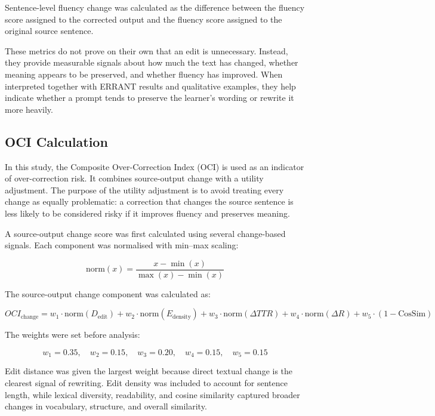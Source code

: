 Sentence-level fluency change was calculated as the difference between the fluency score assigned to the corrected output and the fluency score assigned to the original source sentence.

These metrics do not prove on their own that an edit is unnecessary. Instead, they provide measurable signals about how much the text has changed, whether meaning appears to be preserved, and whether fluency has improved. When interpreted together with ERRANT results and qualitative examples, they help indicate whether a prompt tends to preserve the learner's wording or rewrite it more heavily.

\subsection{OCI Calculation}

In this study, the Composite Over-Correction Index (OCI) is used as an indicator of over-correction risk. It combines source-output change with a utility adjustment. The purpose of the utility adjustment is to avoid treating every change as equally problematic: a correction that changes the source sentence is less likely to be considered risky if it improves fluency and preserves meaning.

A source-output change score was first calculated using several change-based signals. Each component was normalised with min--max scaling:

\begin{equation}
\text{norm}(x) = \frac{x - \min(x)}{\max(x) - \min(x)}
\end{equation}

\noindent The source-output change component was calculated as:

\begin{equation}
OCI_{\text{change}} = w_1 \cdot \text{norm}(D_{\text{edit}}) 
+ w_2 \cdot \text{norm}(E_{\text{density}}) 
+ w_3 \cdot \text{norm}(\Delta TTR) 
+ w_4 \cdot \text{norm}(\Delta R) 
+ w_5 \cdot (1 - \text{CosSim})
\end{equation}

The weights were set before analysis:

\[
w_1 = 0.35,\quad
w_2 = 0.15,\quad
w_3 = 0.20,\quad
w_4 = 0.15,\quad
w_5 = 0.15
\]

Edit distance was given the largest weight because direct textual change is the clearest signal of rewriting. Edit density was included to account for sentence length, while lexical diversity, readability, and cosine similarity captured broader changes in vocabulary, structure, and overall similarity.


